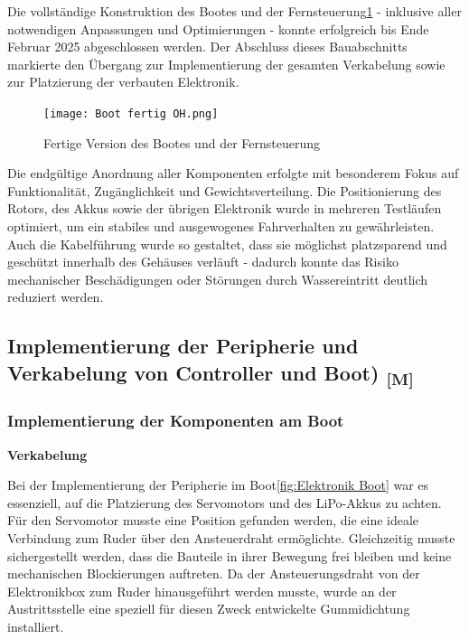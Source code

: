 \documentclass[a4paper,12pt]{article}
\begin{document}
Die vollständige Konstruktion des Bootes und der Fernsteuerung\ref{fig:Fertige Version des Bootes und der Fernsteuerung} - inklusive aller notwendigen Anpassungen und Optimierungen - konnte erfolgreich bis Ende Februar 2025 abgeschlossen werden. Der Abschluss dieses Bauabschnitts markierte den Übergang zur Implementierung der gesamten Verkabelung sowie zur Platzierung der verbauten Elektronik.

\begin{figure}[H]
    \centering
    \texttt{[image: Boot fertig OH.png]}
    \caption{Fertige Version des Bootes und der Fernsteuerung}
    \label{fig:Fertige Version des Bootes und der Fernsteuerung}
\end{figure}

Die endgültige Anordnung aller Komponenten erfolgte mit besonderem Fokus auf Funktionalität, Zugänglichkeit und Gewichtsverteilung. Die Positionierung des Rotors, des Akkus sowie der übrigen Elektronik wurde in mehreren Testläufen optimiert, um ein stabiles und ausgewogenes Fahrverhalten zu gewährleisten. Auch die Kabelführung wurde so gestaltet, dass sie möglichst platzsparend und geschützt innerhalb des Gehäuses verläuft - dadurch konnte das Risiko mechanischer Beschädigungen oder Störungen durch Wassereintritt deutlich reduziert werden.

\newpage

\subsection{\texorpdfstring{Implementierung der Peripherie und Verkabelung von Controller und Boot) \textsubscript{[M]}}{Implementierung der Peripherie und Verkabelung von Controller und Boot) [M]}}

\subsubsection{Implementierung der Komponenten am Boot}

\textbf{Verkabelung}

Bei der Implementierung der Peripherie im Boot\ref{fig:Elektronik Boot} war es essenziell, auf die Platzierung des Servomotors und des LiPo-Akkus zu achten. Für den Servomotor musste eine Position gefunden werden, die eine ideale Verbindung zum Ruder über den Ansteuerdraht ermöglichte. Gleichzeitig musste sichergestellt werden, dass die Bauteile in ihrer Bewegung frei bleiben und keine mechanischen Blockierungen auftreten. Da der Ansteuerungsdraht von der Elektronikbox zum Ruder hinausgeführt werden musste, wurde an der Austrittsstelle eine speziell für diesen Zweck entwickelte Gummidichtung installiert.\newline
\end{document}
